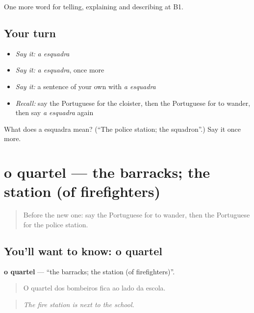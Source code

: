 \begin{grammarlens}[title={What you've built}]
One more word for telling, explaining and describing at B1.
\end{grammarlens}

\subsection*{Your turn}
\begin{itemize}
\raggedright
  \item \emph{Say it:} \emph{a esquadra}
  \item \emph{Say it:} \emph{a esquadra}, once more
  \item \emph{Say it:} a sentence of your own with \emph{a esquadra}
  \item \emph{Recall:} say the Portuguese for the cloister, then the Portuguese for to wander, then say \emph{a esquadra} again
\end{itemize}

\begin{tcolorbox}[breakable,colback=teal!4,colframe=teal!35!black,title={Before you move on}]
What does a esquadra mean? (\textquotedblleft{}The police station; the squadron\textquotedblright{}.) Say it once more.
\end{tcolorbox}
\section[o quartel]{o quartel — the barracks; the station (of firefighters)}

\label{lesson:PT-C443-quartel}



\begin{quote}
Before the new one: say the Portuguese for to wander, then the Portuguese for the police station.
\end{quote}

\subsection*{You'll want to know: o quartel}
\textbf{o quartel} — \textquotedblleft{}the barracks; the station (of firefighters)\textquotedblright{}.

\begin{quote}
O quartel dos bombeiros fica ao lado da escola.
\end{quote}

\begin{quote}
\emph{The fire station is next to the school.}
\end{quote}

